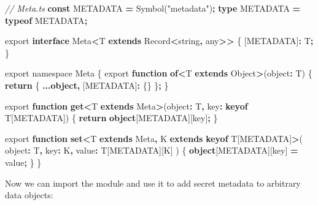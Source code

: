 \documentclass[
]{book}
\newenvironment{Shaded}{\begin{snugshade}}{\end{snugshade}}
\newcommand{\BuiltInTok}[1]{#1}
\newcommand{\CommentTok}[1]{\textcolor[rgb]{0.56,0.35,0.01}{\textit{#1}}}
\newcommand{\ControlFlowTok}[1]{\textcolor[rgb]{0.13,0.29,0.53}{\textbf{#1}}}
\newcommand{\DataTypeTok}[1]{\textcolor[rgb]{0.13,0.29,0.53}{#1}}
\newcommand{\ImportTok}[1]{#1}
\newcommand{\KeywordTok}[1]{\textcolor[rgb]{0.13,0.29,0.53}{\textbf{#1}}}
\newcommand{\NormalTok}[1]{#1}
\newcommand{\OperatorTok}[1]{\textcolor[rgb]{0.81,0.36,0.00}{\textbf{#1}}}
\newcommand{\StringTok}[1]{\textcolor[rgb]{0.31,0.60,0.02}{#1}}
\theoremstyle{definition}
\theoremstyle{definition}
\theoremstyle{definition}
\theoremstyle{definition}
\theoremstyle{remark}
\begin{document}
\begin{Shaded}
\begin{Highlighting}[]
\CommentTok{// Meta.ts}
\KeywordTok{const}\NormalTok{ METADATA }\OperatorTok{=} \BuiltInTok{Symbol}\NormalTok{(}\StringTok{"metadata"}\NormalTok{)}\OperatorTok{;}
\KeywordTok{type}\NormalTok{ METADATA }\OperatorTok{=} \KeywordTok{typeof}\NormalTok{ METADATA}\OperatorTok{;}

\ImportTok{export} \KeywordTok{interface}\NormalTok{ Meta}\OperatorTok{\textless{}}\NormalTok{T }\KeywordTok{extends} \BuiltInTok{Record}\OperatorTok{\textless{}}\DataTypeTok{string}\OperatorTok{,} \DataTypeTok{any}\OperatorTok{\textgreater{}\textgreater{}}\NormalTok{ \{}
\NormalTok{  [METADATA]}\OperatorTok{:}\NormalTok{ T}\OperatorTok{;}
\NormalTok{\}}

\ImportTok{export} \ImportTok{namespace} \DataTypeTok{Meta}\NormalTok{ \{}
  \ImportTok{export} \KeywordTok{function} \KeywordTok{of}\OperatorTok{\textless{}}\NormalTok{T }\KeywordTok{extends} \BuiltInTok{Object}\OperatorTok{\textgreater{}}\NormalTok{(object}\OperatorTok{:}\NormalTok{ T) \{}
    \ControlFlowTok{return}\NormalTok{ \{ }\OperatorTok{...}\KeywordTok{object}\OperatorTok{,}\NormalTok{ [METADATA]}\OperatorTok{:}\NormalTok{ \{\} \}}\OperatorTok{;}
\NormalTok{  \}}

  \ImportTok{export} \KeywordTok{function} \KeywordTok{get}\OperatorTok{\textless{}}\NormalTok{T }\KeywordTok{extends}\NormalTok{ Meta}\OperatorTok{\textgreater{}}\NormalTok{(object}\OperatorTok{:}\NormalTok{ T}\OperatorTok{,}\NormalTok{ key}\OperatorTok{:} \KeywordTok{keyof}\NormalTok{ T[METADATA]) \{}
    \ControlFlowTok{return} \KeywordTok{object}\NormalTok{[METADATA][key]}\OperatorTok{;}
\NormalTok{  \}}

  \ImportTok{export} \KeywordTok{function} \KeywordTok{set}\OperatorTok{\textless{}}\NormalTok{T }\KeywordTok{extends}\NormalTok{ Meta}\OperatorTok{,}\NormalTok{ K }\KeywordTok{extends} \KeywordTok{keyof}\NormalTok{ T[METADATA]}\OperatorTok{\textgreater{}}\NormalTok{(}
\NormalTok{    object}\OperatorTok{:}\NormalTok{ T}\OperatorTok{,}
\NormalTok{    key}\OperatorTok{:}\NormalTok{ K}\OperatorTok{,}
\NormalTok{    value}\OperatorTok{:}\NormalTok{ T[METADATA][K]}
\NormalTok{  ) \{}
    \KeywordTok{object}\NormalTok{[METADATA][key] }\OperatorTok{=}\NormalTok{ value}\OperatorTok{;}
\NormalTok{  \}}
\NormalTok{\}}
\end{Highlighting}
\end{Shaded}

Now we can import the module and use it to add secret metadata to arbitrary data objects:
\end{document}
